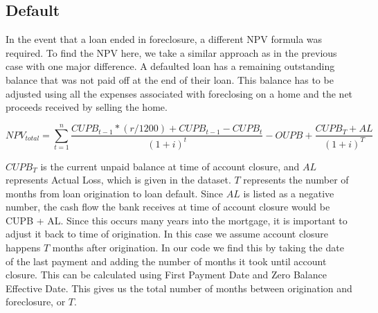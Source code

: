 \documentclass[12 pt]{uncw_thesis}
\theoremstyle{plain}
\theoremstyle{remark}
\theoremstyle{definition}
\begin{document}
\subsection{Default}
In the event that a loan ended in foreclosure, a different NPV formula was required. To find the NPV here, we take a similar approach as in the previous case with one major difference. A defaulted loan has a remaining outstanding balance that was not paid off at the end of their loan. This balance has to be adjusted using all the expenses associated with foreclosing on a home and the net proceeds received by selling the home. 
\begin{centering}
\[NPV_{total} = \sum_{t=1}^n \frac{CUPB_{t-1}*(r/1200) + CUPB_{t-1} - CUPB_{t}}{(1+i)^t} - OUPB + \frac{CUPB_T + AL}{(1+i)^T}\]
\end{centering}
 $CUPB_T$ is the current unpaid balance at time of account closure, and $AL$ represents Actual Loss,  which is given in the dataset. $T$ represents the number of months from loan origination to loan default. Since $AL$ is listed as a negative number, the cash flow the bank receives at time of account closure would be CUPB + AL. Since this occurs many years into the mortgage, it is important to adjust it back to time of origination. In this case we assume account closure happens \(T\) months after origination. In our code we find this by taking the date of the last payment and adding the number of months it took until account closure. This can be calculated using First Payment Date and Zero Balance Effective Date. This gives us the total number of months between origination and foreclosure, or \(T\). 
\end{document}
